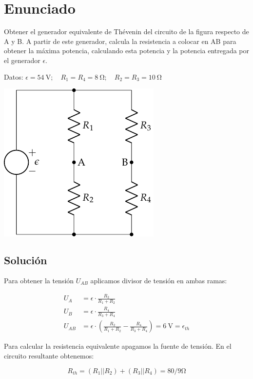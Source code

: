 \section{Enunciado}
Obtener el generador equivalente de Thévenin del circuito de la figura
respecto de A y B. A partir de este generador, calcula la resistencia
a colocar en AB para obtener la máxima potencia, calculando esta
potencia y la potencia entregada por el generador $\epsilon$.

Datos:
$\epsilon = \qty{54}{\volt};\quad R_1 = R_4 = \qty{8}{\ohm};\quad R_2
= R_3 = \qty{10}{\ohm}$

\begin{center}
  \includegraphics{figuras/Thevenin2}
\end{center}

    
\subsection*{Solución}
Para obtener la tensión $U_{AB}$ aplicamos divisor de tensión en ambas
ramas:

\begin{align*}
  U_A &= \epsilon \cdot \frac{R_2}{R_1 + R_2}\\
  U_B &= \epsilon \cdot \frac{R_4}{R_3 + R_4}\\
  U_{AB} &= \epsilon \cdot (\frac{R_2}{R_1 + R_2} -  \frac{R_4}{R_3 + R_4}) = \SI{6}{\volt} = \epsilon_{th}
\end{align*}

Para calcular la resistencia equivalente apagamos la fuente de
tensión. En el circuito resultante obtenemos:

\begin{equation*}
  R_{th} = (R_1 || R_2) + (R_3 || R_4) = 80/9\si{\ohm}
\end{equation*}

